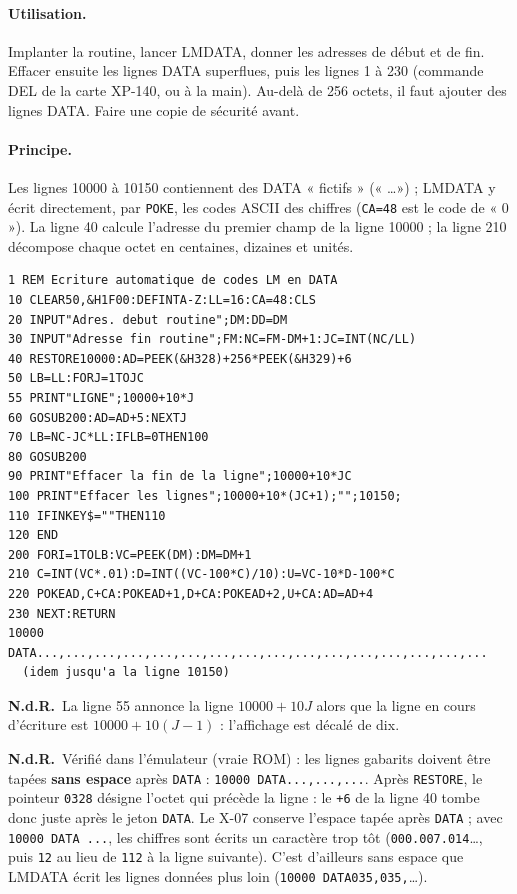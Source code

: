 \documentclass[a4paper,10pt]{article}
\newcommand{\hex}[1]{\texttt{#1}}
\newcommand{\nota}[1]{\textcolor{red!60!black}{\small\textbf{N.d.R.}~#1}}
\begin{document}
\paragraph{Utilisation.} Implanter la routine, lancer LMDATA, donner les
adresses de début et de fin. Effacer ensuite les lignes DATA superflues, puis
les lignes 1 à 230 (commande DEL de la carte XP-140, ou à la main). Au-delà
de 256 octets, il faut ajouter des lignes DATA. Faire une copie de sécurité
avant.

\paragraph{Principe.} Les lignes 10000 à 10150 contiennent des DATA
« fictifs » (« \dots ») ; LMDATA y écrit directement, par \texttt{POKE}, les
codes ASCII des chiffres (\texttt{CA=48} est le code de « 0 »). La ligne 40
calcule l'adresse du premier champ de la ligne 10000 ; la ligne 210 décompose
chaque octet en centaines, dizaines et unités.
\begin{verbatim}
1 REM Ecriture automatique de codes LM en DATA
10 CLEAR50,&H1F00:DEFINTA-Z:LL=16:CA=48:CLS
20 INPUT"Adres. debut routine";DM:DD=DM
30 INPUT"Adresse fin routine";FM:NC=FM-DM+1:JC=INT(NC/LL)
40 RESTORE10000:AD=PEEK(&H328)+256*PEEK(&H329)+6
50 LB=LL:FORJ=1TOJC
55 PRINT"LIGNE";10000+10*J
60 GOSUB200:AD=AD+5:NEXTJ
70 LB=NC-JC*LL:IFLB=0THEN100
80 GOSUB200
90 PRINT"Effacer la fin de la ligne";10000+10*JC
100 PRINT"Effacer les lignes";10000+10*(JC+1);"";10150;
110 IFINKEY$=""THEN110
120 END
200 FORI=1TOLB:VC=PEEK(DM):DM=DM+1
210 C=INT(VC*.01):D=INT((VC-100*C)/10):U=VC-10*D-100*C
220 POKEAD,C+CA:POKEAD+1,D+CA:POKEAD+2,U+CA:AD=AD+4
230 NEXT:RETURN
10000 DATA...,...,...,...,...,...,...,...,...,...,...,...,...,...,...,...
  (idem jusqu'a la ligne 10150)
\end{verbatim}
\nota{La ligne 55 annonce la ligne $10000+10J$ alors que la ligne en cours
d'écriture est $10000+10(J-1)$ : l'affichage est décalé de dix.}

\nota{Vérifié dans l'émulateur (vraie ROM) : les lignes gabarits doivent être
tapées \textbf{sans espace} après \texttt{DATA} : \texttt{10000
DATA...,...,...}. Après \texttt{RESTORE}, le pointeur \hex{0328} désigne
l'octet qui précède la ligne : le \texttt{+6} de la ligne 40 tombe donc
juste après le jeton \texttt{DATA}. Le X-07 conserve l'espace tapée après
\texttt{DATA} ; avec \texttt{10000 DATA ...}, les chiffres sont écrits un
caractère trop tôt (\texttt{000.007.014}\dots, puis \texttt{12} au lieu de
\texttt{112} à la ligne suivante). C'est d'ailleurs sans espace que
LMDATA écrit les lignes données plus loin (\texttt{10000 DATA035,035,}\dots).}
\end{document}
